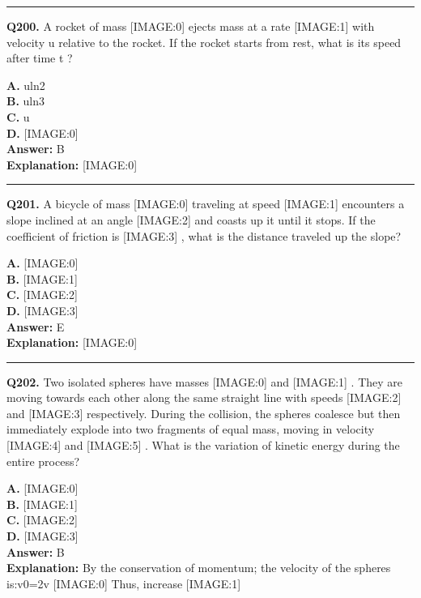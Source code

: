 \documentclass[12pt]{article}
\begin{document}
\hrule
\vspace{1em}


\noindent
\textbf{Q200.} A rocket of mass
[IMAGE:0]
ejects mass at a rate
[IMAGE:1]
with velocity u
relative to the rocket. If the rocket starts from rest, what is its speed after time t
?



\textbf{A.} uln2 \\
\textbf{B.} uln3 \\
\textbf{C.} u \\
\textbf{D.} [IMAGE:0] \\

\textbf{Answer:} B \\
\textbf{Explanation:} [IMAGE:0]

\hrule
\vspace{1em}


\noindent
\textbf{Q201.} A bicycle of mass
[IMAGE:0]
traveling at speed
[IMAGE:1]
encounters a slope inclined at an angle
[IMAGE:2]
and coasts up it until it stops. If the coefficient of friction is
[IMAGE:3]
, what is the distance traveled up the slope?



\textbf{A.} [IMAGE:0] \\
\textbf{B.} [IMAGE:1] \\
\textbf{C.} [IMAGE:2] \\
\textbf{D.} [IMAGE:3] \\

\textbf{Answer:} E \\
\textbf{Explanation:} [IMAGE:0]

\hrule
\vspace{1em}


\noindent
\textbf{Q202.} Two isolated spheres have masses
[IMAGE:0]
and
[IMAGE:1]
. They are moving towards each other along the same straight line with speeds
[IMAGE:2]
and
[IMAGE:3]
respectively. During the collision, the spheres coalesce but then immediately explode into two fragments of equal mass, moving in velocity
[IMAGE:4]
and
[IMAGE:5]
. What is the variation of kinetic energy during the entire process?



\textbf{A.} [IMAGE:0] \\
\textbf{B.} [IMAGE:1] \\
\textbf{C.} [IMAGE:2] \\
\textbf{D.} [IMAGE:3] \\

\textbf{Answer:} B \\
\textbf{Explanation:} By the conservation of momentum; the velocity of the spheres is:v0=2v
[IMAGE:0]
Thus, increase
[IMAGE:1]
\end{document}
